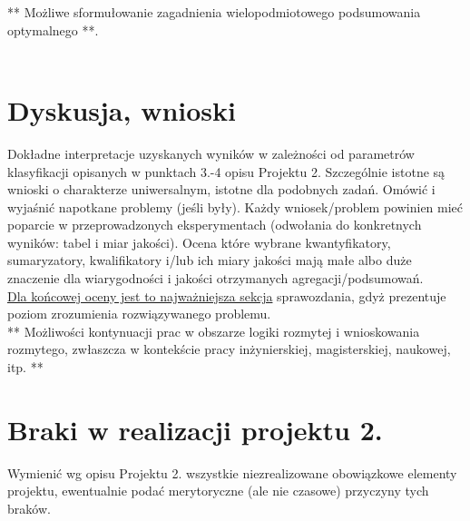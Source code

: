 \documentclass{classrep}
\begin{document}
** Możliwe sformułowanie zagadnienia wielopodmiotowego podsumowania optymalnego **.\\
\\



\section{Dyskusja, wnioski}
Dokładne interpretacje uzyskanych wyników w zależności od parametrów klasyfikacji
opisanych w punktach 3.-4 opisu Projektu 2. 
Szczególnie istotne są wnioski o charakterze uniwersalnym, istotne dla podobnych zadań. 
Omówić i wyjaśnić napotkane problemy (jeśli były). Każdy wniosek/problem powinien mieć poparcie
w przeprowadzonych eksperymentach (odwołania do konkretnych wyników: tabel i miar
jakości). Ocena które wybrane kwantyfikatory, sumaryzatory, kwalifikatory i/lub ich
miary jakości mają małe albo duże znaczenie dla wiarygodności i jakości otrzymanych
agregacji/podsumowań.  \\
\underline{Dla końcowej oceny jest to najważniejsza sekcja} sprawozdania, gdyż prezentuje poziom
zrozumienia rozwiązywanego problemu.\\

** Możliwości kontynuacji prac w obszarze logiki rozmytej i wnioskowania rozmytego, zwłaszcza w kontekście pracy inżynierskiej,
magisterskiej, naukowej, itp. **\\



\section{Braki w realizacji projektu 2.}
Wymienić wg opisu Projektu 2. wszystkie niezrealizowane obowiązkowe elementy projektu, ewentualnie
podać merytoryczne (ale nie czasowe) przyczyny tych braków. 
\end{document}
